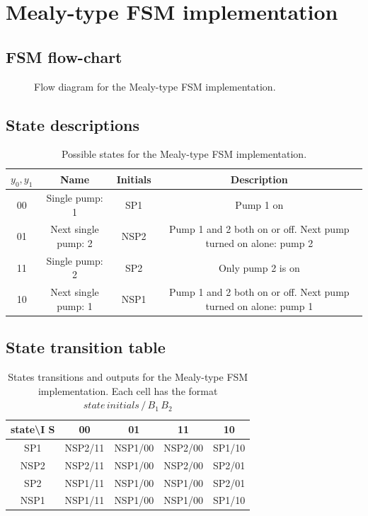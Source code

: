 \documentclass[../../e3_tp3_main.tex]{subfiles}
\begin{document}
\section{Mealy-type FSM implementation}
\subsection{FSM flow-chart}
\begin{figure}[H]
	\centering
	
	\caption{Flow diagram for the Mealy-type FSM implementation.}
\end{figure}


\subsection{State descriptions}
\begin{table}[H]	%
	\centering
	\begin{tabular}{|c|c|c|c|}
	\hline	
	$y_0, y_1$ & Name & Initials & Description\\	
	\hline 
	00 & Single pump: 1 &SP1& Pump 1 on\\ 
	\hline 
	01 & Next single pump: 2 &NSP2& Pump 1 and 2 both on or off. Next pump turned on alone: pump 2\\ 
	\hline 
	11 & Single pump: 2 &SP2& Only pump 2 is on\\ 
	\hline 
	10 & Next single pump: 1 &NSP1& Pump 1 and 2 both on or off. Next pump turned on alone: pump 1 \\ 
	\hline 
	\end{tabular} 
	\caption{Possible states for the Mealy-type FSM implementation.}
	\label{tab:ej1_mealy_states}
\end{table}

\subsection{State transition table}
\begin{table}[H]
	\centering
	\begin{tabular}{|c|c|c|c|c|}
		\hline 
		state\textbackslash I S & 00 & 01 & 11 & 10 \\ 
		\hline 
		SP1 & NSP2/11 & NSP1/00 & NSP2/00 & SP1/10 \\ 
		\hline 
		NSP2 & NSP2/11 & NSP1/00 & NSP2/00 & SP2/01 \\ 
		\hline 
		SP2 & NSP1/11 & NSP1/00 & NSP1/00 & SP2/01 \\ 
		\hline 
		NSP1 & NSP1/11 & NSP1/00 & NSP1/00 & SP1/10 \\ 
		\hline 
	\end{tabular} 
	\caption[States transitions and outputs for the Mealy-type FSM implementation]{States transitions and outputs for the Mealy-type FSM implementation. Each cell has the format $state\, initials \,/\, B_1\, B_2$}
	\label{tab:ej1_mealy_transitions}
\end{table}
\end{document}
